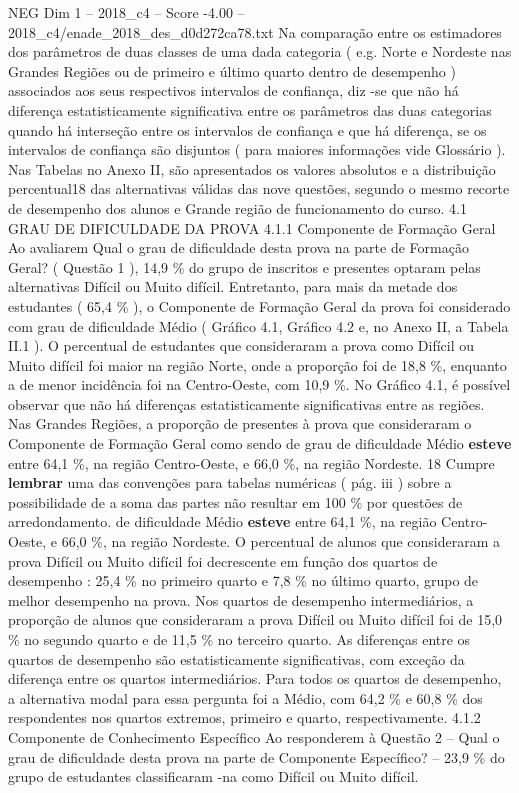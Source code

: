 \begin{textsample}{NEG Dim 1 – 2018\_c4 – Score -4.00 – 2018\_c4/enade\_2018\_des\_d0d272ca78.txt}
Na comparação entre os estimadores dos parâmetros de duas classes de uma dada categoria ( e.g.
Norte e Nordeste nas Grandes Regiões ou de primeiro e último quarto dentro de desempenho ) associados aos seus respectivos intervalos de confiança, diz -se que não há diferença estatisticamente significativa entre os parâmetros das duas categorias quando há interseção entre os intervalos de confiança e que há diferença, se os intervalos de confiança são disjuntos ( para maiores informações vide Glossário ).
Nas Tabelas no Anexo II, são apresentados os valores absolutos e a distribuição percentual18 das alternativas válidas das nove questões, segundo o mesmo recorte de desempenho dos alunos e Grande região de funcionamento do curso. 4.1 GRAU DE DIFICULDADE DA PROVA 4.1.1 Componente de Formação Geral Ao avaliarem Qual o grau de dificuldade desta prova na parte de Formação Geral? ( Questão 1 ), 14,9 \% do grupo de inscritos e presentes optaram pelas alternativas Difícil ou Muito difícil.
Entretanto, para mais da metade dos estudantes ( 65,4 \% ), o Componente de Formação Geral da prova foi considerado com grau de dificuldade Médio ( Gráfico 4.1, Gráfico 4.2 e, no Anexo II, a Tabela II.1 ).
O percentual de estudantes que consideraram a prova como Difícil ou Muito difícil foi maior na região Norte, onde a proporção foi de 18,8 \%, enquanto a de menor incidência foi na Centro-Oeste, com 10,9 \%.
No Gráfico 4.1, é possível observar que não há diferenças estatisticamente significativas entre as regiões.
Nas Grandes Regiões, a proporção de presentes à prova que consideraram o Componente de Formação Geral como sendo de grau de dificuldade Médio \textbf{esteve} entre 64,1 \%, na região Centro-Oeste, e 66,0 \%, na região Nordeste. 18 Cumpre \textbf{lembrar} uma das convenções para tabelas numéricas ( pág. iii ) sobre a possibilidade de a soma das partes não resultar em 100 \% por questões de arredondamento. de dificuldade Médio \textbf{esteve} entre 64,1 \%, na região Centro-Oeste, e 66,0 \%, na região Nordeste.
O percentual de alunos que consideraram a prova Difícil ou Muito difícil foi decrescente em função dos quartos de desempenho : 25,4 \% no primeiro quarto e 7,8 \% no último quarto, grupo de melhor desempenho na prova.
Nos quartos de desempenho intermediários, a proporção de alunos que consideraram a prova Difícil ou Muito difícil foi de 15,0 \% no segundo quarto e de 11,5 \% no terceiro quarto.
As diferenças entre os quartos de desempenho são estatisticamente significativas, com exceção da diferença entre os quartos intermediários.
Para todos os quartos de desempenho, a alternativa modal para essa pergunta foi a Médio, com 64,2 \% e 60,8 \% dos respondentes nos quartos extremos, primeiro e quarto, respectivamente. 4.1.2 Componente de Conhecimento Específico Ao responderem à Questão 2 – Qual o grau de dificuldade desta prova na parte de Componente Específico? – 23,9 \% do grupo de estudantes classificaram -na como Difícil ou Muito difícil.

\end{textsample}
